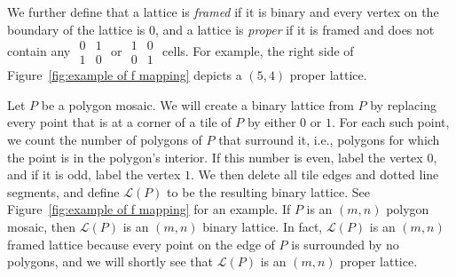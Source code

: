 \documentclass[12pt]{article}
\theoremstyle{plain}
\theoremstyle{remark}
\theoremstyle{definition}
\newtheorem{definition}{Definition}[section]
\theoremstyle{remark}
\theoremstyle{definition}
\begin{document}
We further define that a lattice is \emph{framed} if it is binary
and every vertex on the boundary of the lattice is $0$, and a lattice is \emph{proper} if it is framed and does not contain any $\begin{smallmatrix}0 & 1\\1 & 0 \end{smallmatrix}$ or $\begin{smallmatrix}1 & 0\\0 & 1\end{smallmatrix}$ cells. For example, the right side of Figure~\ref{fig:example of f mapping} depicts a $\left(5,4\right)$ proper lattice.


Let $P$ be a polygon mosaic. We will create a binary lattice from $P$ by replacing every point that is at a corner of a tile of $P$ by either $0$ or $1$. For each such point, we count the number of polygons of $P$ that surround it, i.e., polygons for which the point is in the polygon's interior. If this number is even, label the vertex $0$, and if it is odd, label the vertex $1$. We then delete all  tile edges and dotted line segments, and define $\mathscr{L}\left(P\right)$ to be the resulting binary lattice. See Figure~\ref{fig:example of f mapping} for an example. If $P$ is an $\left(m,n\right)$ polygon mosaic, then $\mathscr{L}\left(P\right)$ is an $\left(m,n\right)$ binary lattice. In fact, $\mathscr{L}\left(P\right)$ is an $\left(m,n\right)$ framed lattice because every point on the edge of $P$ is surrounded by no polygons, and we will shortly see that $\mathscr{L}(P)$ is an $(m,n)$ proper lattice.
\end{document}
